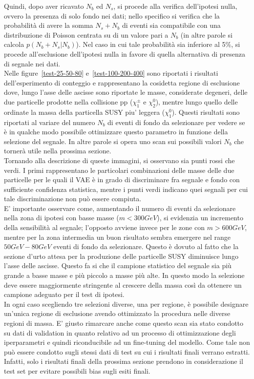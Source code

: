 Quindi, dopo aver ricavato $N_b$ ed $N_s$, si procede alla verifica dell'ipotesi nulla, ovvero la presenza di solo fondo nei dati; nello specifico si verifica che la probabilità di avere la somma $N_s + N_b$ di eventi sia compatibile con una distribuzione di Poisson centrata su di un valore pari a $N_b$ (in altre parole si calcola $p(N_b + N_s | N_b)$). Nel caso in cui tale probabilità sia inferiore al 5\%, si procede all'esclusione dell'ipotesi nulla in favore di quella alternativa di presenza di segnale nei dati.\\
Nelle figure~\ref{test-25-50-80} e~\ref{test-100-200-400} sono riportati i risultati dell'esperimento di conteggio e rappresentano la cosidetta regione di esclusione dove, lungo l'asse delle ascisse sono riportate le masse, considerate degeneri, delle due particelle prodotte nella collisione pp ($\chi^\pm_1$ e $\chi^0_2$), mentre lungo quello delle ordinate la massa della particella SUSY piu' leggera ($\chi^0_1$). Questi risultati sono riportati al variare del numero $N_{b}$ di eventi di fondo da selezionare per vedere se è in qualche modo possibile ottimizzare questo parametro in funzione della selezione del segnale. In altre parole si opera uno scan sui possibili valori $N_{b}$ che tornerà utile nella prossima sezione.\\
Tornando alla descrizione di queste immagini, si osservano sia punti rossi che verdi. I primi rappresentano le particolari combinazioni delle masse delle due particelle per le quali il VAE è in grado di discriminare fra segnale e fondo con sufficiente confidenza statistica, mentre i punti verdi indicano  quei segnali per cui tale discriminazione non può essere compiuta.\\
E' importante osservare come, aumentando il numero di eventi da selezionare nella zona di ipotesi con basse masse ($m < 300 GeV$), si evidenzia un incremento della sensibilità al segnale; l'opposto avviene invece per le zone con $m > 600 GeV$, mentre per la zona intermedia un buon risultato sembra emergere nel range $50 GeV - 80 GeV$ eventi di fondo da selezionare. Questo è dovuto al fatto che la sezione d'urto attesa per la produzione delle particelle SUSY diminuisce lungo l'asse delle ascisse. Questo fa si che il campione statistico del segnale sia più grande a basse masse e più piccolo a masse più alte. In questo modo la selezione deve essere maggiormente stringente al crescere della massa così da ottenere un campione adeguato per il test di ipotesi.\\
In ogni caso scegliendo tre selezioni diverse, una per regione, è possibile designare un'unica regione di esclusione avendo ottimizzato la procedura nelle diverse regioni di massa. E' giusto rimarcare anche come questo scan sia stato condotto su dati di validation in quanto relativo ad un processo di ottimizzazione degli iperparametri e quindi riconducibile ad un fine-tuning del modello. Come tale non può essere condotto sugli stessi dati di test su cui i risultati finali verrano estratti. Infatti, solo i risultati finali della prossima sezione prendono in considerazione il test set per evitare possibili bias sugli esiti finali.

